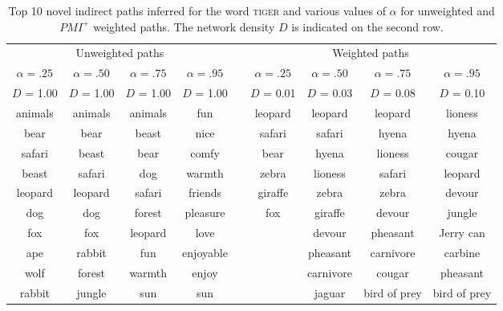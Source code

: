 \documentclass[doc]{apa6}
\newcommand{\stimulus}[1]{\textsc{#1}}
\begin{document}
\begin{table}[ht]
\centering
\caption{Top 10 novel indirect paths inferred for the word \stimulus{tiger} and various values of $\alpha$ for unweighted and $PMI^+$ weighted paths. The network density $D$ is indicated on the second row.}
\begin{small}
\label{my-label}
\begin{tabular}{cccclcccc}
\toprule
\multicolumn{4}{c}{Unweighted paths} &  & \multicolumn{4}{c}{Weighted paths} \\
\cline{1-4} \cline{6-9}
$\alpha = .25$ & $\alpha = .50$          & $\alpha = .75$   &   $\alpha = .95$         & &
$\alpha = .25$ & $\alpha = .50$          & $\alpha = .75$   &   $\alpha = .95$              \\
$D$  = 1.00   & $D$  = 1.00  & $D$  = 1.00 & $D$  = 1.00 & &
$D$  = 0.01   & $D$  = 0.03  & $D$  = 0.08 & $D$  = 0.10 \\
\midrule
animals & animals & animals & fun 		& & leopard & leopard   & leopard      	& lioness  \\
bear    & bear    & beast   & nice     	& & safari  & safari   & hyena   	& hyena        \\
safari  & beast   & bear    & comfy     & & bear    & hyena    & lioness 	& cougar       \\
beast   & safari  & dog     & warmth    & & zebra   & lioness  & safari  	& leopard      \\
leopard & leopard & safari  & friends  	& & giraffe & zebra    & zebra       & devour      \\
dog     & dog     & forest  & pleasure 	& &fox     & giraffe   & devour      & jungle      \\
fox     & fox     & leopard & love    	& &        & devour    & pheasant    & Jerry can   \\
ape     & rabbit  & fun     & enjoyable & &        & pheasant  & carnivore   & carbine     \\
wolf    & forest  & warmth  & enjoy 	& &        & carnivore & cougar      & pheasant    \\
rabbit  & jungle  & sun     & sun       & &        & jaguar    & bird of prey& bird of prey\\
\bottomrule
\end{tabular}
\end{small}
\label{Table:tiger}
\end{table}
\end{document}
